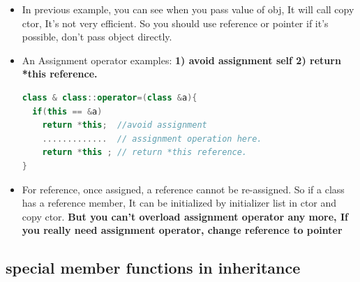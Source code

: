 \documentclass[a4paper,12pt,twoside]{book}
\begin{document}
\begin{itemize}
\item In previous example, you can see when you pass  value of obj, It will call copy ctor, It's not very efficient. So you should use reference or pointer if it's possible, don't pass object directly.


\item An Assignment operator examples: \textbf{1) avoid assignment self 2) return *this reference. }
\begin{lstlisting}[frame=single, language=c++]
class & class::operator=(class &a){
  if(this == &a)
    return *this;  //avoid assignment
    .............  // assignment operation here.
    return *this ; // return *this reference.
}
\end{lstlisting}

\item For reference, once assigned, a reference cannot be re-assigned. So if a class has a reference member, It can be initialized by initializer list in ctor and copy ctor. \textbf{But you can't overload assignment operator any more, If you really need assignment operator, change reference to pointer}

\end{itemize}


\subsection{special member functions in inheritance}
\end{document}

